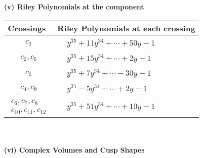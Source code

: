 \documentclass[1p]{elsarticle_modified}
\theoremstyle{definition}
\begin{document}
\newpage\renewcommand{\arraystretch}{1}
\flushleft \textbf{(v) Riley Polynomials at the component}\newline \\
\begin{tabular}{m{50pt}|m{274pt}}
Crossings & \hspace{64pt}Riley Polynomials at each crossing \\
\hline $$\begin{aligned}c_{1}\end{aligned}$$&$\begin{aligned}
&y^{35}+11 y^{34}+\cdots+50 y-1
\end{aligned}$\\
\hline $$\begin{aligned}c_{2},c_{5}\end{aligned}$$&$\begin{aligned}
&y^{35}+15 y^{34}+\cdots+2 y-1
\end{aligned}$\\
\hline $$\begin{aligned}c_{3}\end{aligned}$$&$\begin{aligned}
&y^{35}+7 y^{34}+\cdots-30 y-1
\end{aligned}$\\
\hline $$\begin{aligned}c_{4},c_{9}\end{aligned}$$&$\begin{aligned}
&y^{35}-5 y^{34}+\cdots+2 y-1
\end{aligned}$\\
\hline $$\begin{aligned}c_{6},c_{7},c_{8}\\c_{10},c_{11},c_{12}\end{aligned}$$&$\begin{aligned}
&y^{35}+51 y^{34}+\cdots+10 y-1
\end{aligned}$\\
\hline
\end{tabular}\\~\\
\newpage\flushleft \textbf{(vi) Complex Volumes and Cusp Shapes}
\end{document}
